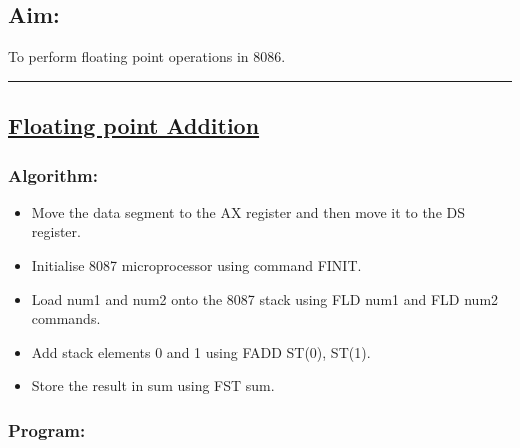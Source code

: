 \documentclass[10pt,a4paper]{article}
\begin{document}
\begin{flushleft}
\subsection*{\textbf{Aim:}} 
To perform floating point operations in 8086.

\vspace{1cm}
\hrule
\subsection*{\textbf{\underline{Floating point Addition}}}

\subsubsection*{\textbf{Algorithm:}}
\begin{itemize}
    \item Move the data segment to the AX register and then move it to the DS register.
    \item Initialise 8087 microprocessor using command FINIT.
    \item Load num1 and num2 onto the 8087 stack using FLD num1 and FLD num2 commands.
    \item Add stack elements 0 and 1 using FADD ST(0), ST(1).
    \item Store the result in sum using FST sum.
\end{itemize}

\newpage
\subsubsection*{\textbf{Program:}}


\end{flushleft}
\end{document}
